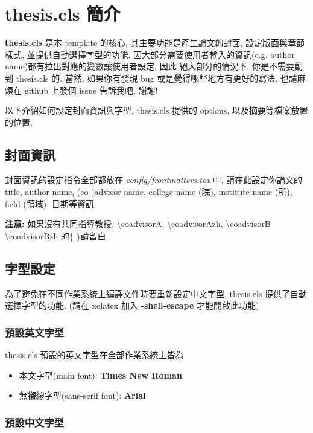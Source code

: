 \chapter{thesis.cls 簡介}
\label{chapter:doccls}

\textbf{thesis.cls} 是本 template 的核心, 其主要功能是產生論文的封面, 設定版面與章節樣式, 並提供自動選擇字型的功能.
因大部分需要使用者輸入的資訊(e.g. author name)都有拉出對應的變數讓使用者設定, 因此
絕大部分的情況下, 你是不需要動到 thesis.cls 的.
當然, 如果你有發現 bug 或是覺得哪些地方有更好的寫法, 也請麻煩在 github 上發個 issue 告訴我吧, 謝謝!

以下介紹如何設定封面資訊與字型, thesis.cls 提供的 options, 以及摘要等檔案放置的位置.

\section{封面資訊}

封面資訊的設定指令全部都放在 \textit{config/frontmatters.tex} 中, 請在此設定你論文的 title, author name, (co-)advisor name, college name (院), institute name (所), field (領域), 日期等資訊.

\textbf{注意:} 如果沒有共同指導教授, \textbackslash coadvisorA, \textbackslash coadvisorAzh, \textbackslash coadvisorB \textbackslash coadvisorBzh 的\{ \}請留白.

\section{字型設定}
\label{sec:fonts}

為了避免在不同作業系統上編譯文件時要重新設定中文字型, thesis.cls 提供了自動選擇字型的功能.
(請在 xelatex 加入 \textbf{-shell-escape} 才能開啟此功能)

\subsection{預設英文字型}

thesis.cls 預設的英文字型在全部作業系統上皆為
\begin{itemize}
\item 本文字型(main font): \textbf{Times New Roman}
\item 無襯線字型(sans-serif font): \textbf{Arial}
\end{itemize}

\subsection{預設中文字型}

